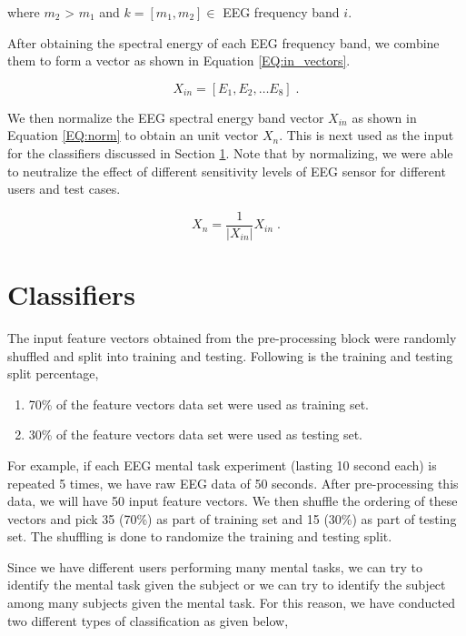     \noindent where $m_2$ > $m_1$ and $k=[m_1,m_2] \in $ EEG frequency band $i$.
    
    After obtaining the spectral energy of each EEG frequency band, we combine them to form a vector as shown in Equation \ref{EQ:in_vectors}.
    
    \begin{equation}
    	X_{in} = [E_1, E_2, \ldots E_8] \;.
    	\label{EQ:in_vectors}
    \end{equation}
    
    We then normalize the EEG spectral energy band vector $X_{in}$ as shown in Equation \ref{EQ:norm} to obtain an unit vector $X_{n}$. This is next used as the input for the classifiers discussed in Section \ref{Chap3:Classifiers}. Note that by normalizing, we were able to neutralize the effect of different sensitivity levels of EEG sensor for different users and test cases.
   
	\begin{equation}
    	X_{n} = \frac{1}{\left | X_{in} \right |} X_{in} \;.
    	\label{EQ:norm}
    \end{equation}
    
\section{Classifiers}
\label{Chap3:Classifiers}

		The input feature vectors obtained from the pre-processing block were randomly shuffled and split into training and testing. Following is the training and testing split percentage, 
		\begin{enumerate} 
			\item 70\% of the feature vectors data set were used as training set.
			\item 30\% of the feature vectors data set were used as testing set.
		\end{enumerate}
		For example, if each EEG mental task experiment (lasting 10 second each) is repeated 5 times, we have raw EEG data of 50 seconds. After pre-processing this data, we will have 50 input feature vectors. We then shuffle the ordering of these vectors and pick 35 (70\%) as part of training set and 15 (30\%) as part of testing set. The shuffling is done to randomize the training and testing split.
        
        Since we have different users performing many mental tasks, we can try to identify the mental task given the subject or we can try to identify the subject among many subjects given the mental task. For this reason, we have conducted two different types of classification as given below,
        
